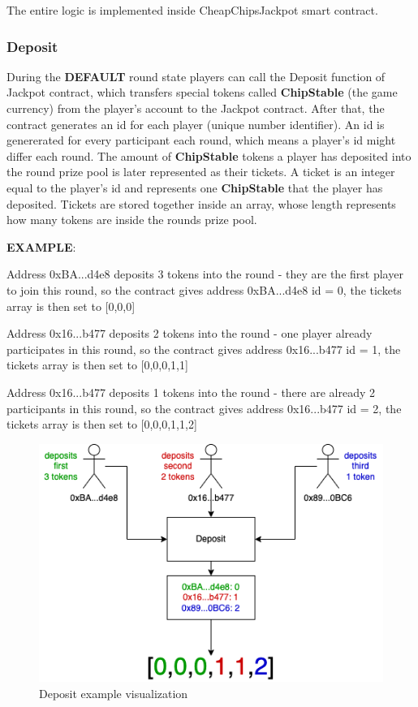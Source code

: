 \documentclass[12pt]{article}
\begin{document}
The entire logic is implemented inside CheapChipsJackpot smart contract.

\subsubsection{Deposit}

During the \textbf{DEFAULT} round state players can call the Deposit function of Jackpot contract, which transfers special tokens called \textbf{ChipStable} (the game currency) from the player's account to the Jackpot contract. After that, the contract generates an id for each player (unique number identifier). An id is genererated for every participant each round, which means a player's id might differ each round. The amount of \textbf{ChipStable} tokens a player has deposited into the round prize pool is later represented as their tickets. A ticket is an integer equal to the player's id and represents one \textbf{ChipStable} that the player has deposited. Tickets are stored together inside an array, whose length represents how many tokens are inside the rounds prize pool.  

\newpage

\textbf{EXAMPLE}:

Address 0xBA...d4e8 deposits 3 tokens into the round - they are the first player to join this round, so the contract gives address 0xBA...d4e8 id = 0, the tickets array is then set to [0,0,0]

Address 0x16...b477 deposits 2 tokens into the round - one player already participates in this round, so the contract gives address 0x16...b477 id = 1, the tickets array is then set to [0,0,0,1,1]

Address 0x16...b477 deposits 1 tokens into the round - there are already 2 participants in this round, so the contract gives address 0x16...b477 id = 2, the tickets array is then set to [0,0,0,1,1,2]

\begin{figure}[!ht]
    \centering
    \includegraphics[scale=0.6]{images/deposit.png} 
    \caption{Deposit example visualization}
    \label{fig:b1}
\end{figure}
\FloatBarrier
\end{document}
